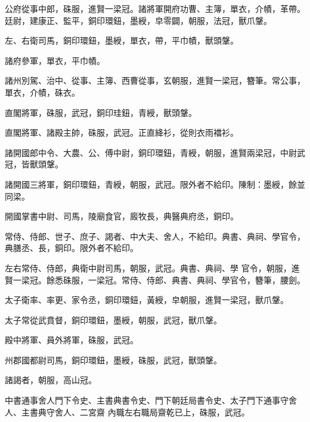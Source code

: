 \begin{pinyinscope}
 公府從事中郎，硃服，進賢一梁冠。諸將軍開府功曹、主簿，單衣，介幘，革帶。廷尉，建康正、監平，銅印環鈕，墨綬，皁零闢，朝服，法冠，獸爪鞶。



 左、右衛司馬，銅印環鈕，墨綬，單衣，帶，平巾幘，獸頭鞶。



 諸府參軍，單衣，平巾幘。



 諸州別駕、治中、從事、主簿、西曹從事，玄朝服，進賢一梁冠，簪筆。常公事，單衣，介幘，硃衣。



 直閣將軍，硃服，武冠，銅印珪鈕，青綬，獸頭鞶。



 直閣將軍、諸殿主帥，硃服，武冠。正直絳衫，從則衣雨襠衫。



 諸開國郎中令、大農、公、傅中尉，銅印環鈕，青綬，朝服，進賢兩梁冠，中尉武冠，皆獸頭鞶。



 諸開國三將軍，銅印環鈕，青綬，朝服，武冠。限外者不給印。陳制：墨綬，餘並同梁。



 開國掌書中尉、司馬，陵廟食官，廄牧長，典醫典府丞，銅印。



 常侍、侍郎、世子、庶子、謁者、中大夫、舍人，不給印。典書、典祠、學官令，典膳丞、長，銅印。限外者不給印。



 左右常侍、侍郎，典衛中尉司馬，朝服，武冠。典書、典祠、學
 官令，朝服，進賢一梁冠。餘悉硃服，一梁冠。常侍、侍郎、典書、典祠、學官令，簪筆，腰劍。



 太子衛率、率更、家令丞，銅印環鈕，黃綬，皁朝服，進賢一梁冠，獸爪鞶。



 太子常從武賁督，銅印環鈕，墨綬，朝服，武冠，獸爪鞶。



 殿中將軍、員外將軍，硃服，武冠。



 州郡國都尉司馬，銅印環鈕，墨綬，硃服，武冠，獸頭鞶。



 諸謁者，朝服，高山冠。



 中書通事舍人門下令史、主書典書令史、門下朝廷局書令史、太子門下通事守舍人、主書典守舍人、二宮齋
 內職左右職局齋乾已上，硃服，武冠。




\end{pinyinscope}
